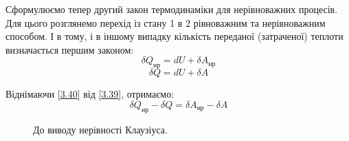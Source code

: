 Сформулюємо тепер другий закон термодинаміки для нерівноважних процесів. Для цього розглянемо перехід
із стану 1 в 2 рівноважним та нерівноважним способом. І в тому, і в іншому випадку кількість переданої
(затраченої) теплоти визначається першим законом:
\begin{equation}\label{3.39}
	\delta Q_{\text{нр}} = dU + \delta A_{\text{нр}}
\end{equation}
\begin{equation}\label{3.40}
	\delta Q = dU + \delta A
\end{equation}

Віднімаючи \eqref{3.40} від \eqref{3.39}, отримаємо:
\begin{equation}\label{3.41}
	\delta Q_{\text{нр}} - \delta Q = \delta A_{\text{нр}} - \delta A
\end{equation}

\begin{figure}[h!]\centering
    
\caption{До виводу нерівності Клаузіуса.}
\label{pic:3.8}
\end{figure}



